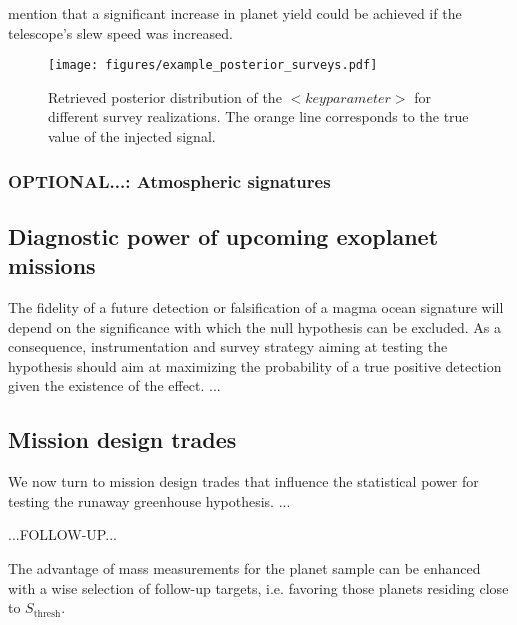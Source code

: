 \documentclass[modern]{aastex631}
\begin{document}
\begin{note}
    \citet{Penny2019} mention that a significant increase in planet yield could be achieved if the telescope's slew speed was increased.
\end{note}

\begin{figure}[ht!]
    \begin{centering}

        \texttt{[image: figures/example\_posterior\_surveys.pdf]}
        \caption{
            Retrieved posterior distribution of the $<key parameter>$ for different survey realizations.
            The orange line corresponds to the true value of the injected signal.
        }
        \label{fig:posterior_surveys}
    \end{centering}
\end{figure}

\subsubsection{OPTIONAL...: Atmospheric signatures}


\subsection{Diagnostic power of upcoming exoplanet missions}
The fidelity of a future detection or falsification of a magma ocean signature will depend on the significance with which the null hypothesis can be excluded.
As a consequence, instrumentation and survey strategy aiming at testing the hypothesis should aim at maximizing the probability of a true positive detection given the existence of the effect.
...

\subsection{Mission design trades}\label{sec:mission-design-trades}
We now turn to mission design trades that influence the statistical power for testing the runaway greenhouse hypothesis.
...
\begin{note}
...FOLLOW-UP...

The advantage of mass measurements for the planet sample can be enhanced with a wise selection of follow-up targets, i.e. favoring those planets residing close to $S_\mathrm{thresh}$.
\end{note}
\end{document}
